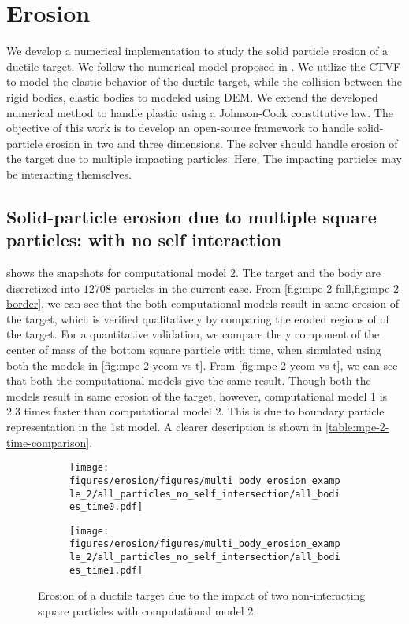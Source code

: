 \FloatBarrier%
\chapter{Erosion}
\label{chap:erosion}
We develop a numerical implementation to study the solid particle erosion of a
ductile target. We follow the numerical model proposed in
\citep{dong2016smoothed}. We utilize the CTVF to model the elastic behavior of
the ductile target, while the collision between the rigid bodies, elastic bodies
to modeled using DEM. We extend the developed numerical method to handle plastic
using a Johnson-Cook constitutive law. The objective of this work is to develop
an open-source framework to handle solid-particle erosion in two and three
dimensions. The solver should handle erosion of the target due to multiple
impacting particles. Here, The impacting particles may be interacting
themselves.


\FloatBarrier%
\section{Solid-particle erosion due to multiple square particles: with no self
  interaction}
\label{sec:res:mpe-2}

 shows the snapshots for computational model 2. The target
and the body are discretized into $12708$ particles in the current case. From
\cref{fig:mpe-2-full,fig:mpe-2-border}, we can see that the both computational
models result in same erosion of the target, which is verified qualitatively by
comparing the eroded regions of of the target. For a quantitative validation, we
compare the y component of the center of mass of the bottom square particle with
time, when simulated using both the models in \cref{fig:mpe-2-ycom-vs-t}. From
\cref{fig:mpe-2-ycom-vs-t}, we can see that both the computational models give
the same result. Though both the models result in same erosion of the target,
however, computational model 1 is $2.3$ times faster than computational model 2.
This is due to boundary particle representation in the 1st model. A clearer
description is shown in \cref{table:mpe-2-time-comparison}.
\begin{figure}[!htpb]
  \centering
  \begin{subfigure}{0.48\textwidth}
    \centering
    \texttt{[image: figures/erosion/figures/multi\_body\_erosion\_example\_2/all\_particles\_no\_self\_intersection/all\_bodies\_time0.pdf]}
    \subcaption{}
    \label{fig:mpe-2-full-a}
  \end{subfigure}
  \begin{subfigure}{0.48\textwidth}
    \centering
    \texttt{[image: figures/erosion/figures/multi\_body\_erosion\_example\_2/all\_particles\_no\_self\_intersection/all\_bodies\_time1.pdf]}
    \subcaption{}
    \label{fig:mpe-2-full-b}
  \end{subfigure}
  \caption{Erosion of a ductile target due to the impact of two non-interacting
    square particles with computational model 2.}
\label{fig:mpe-2-full}
\end{figure}

